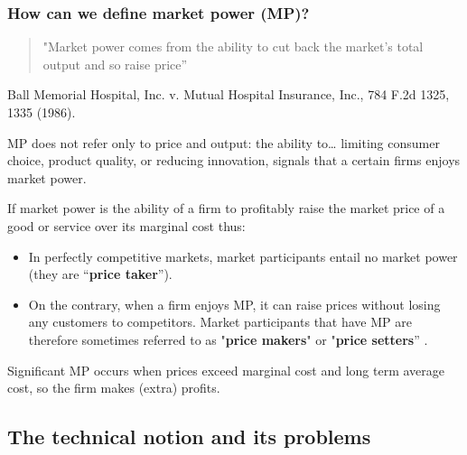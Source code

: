         \subsubsection{How can we define market power (MP)?}

            \begin{quote}
                 "Market power comes from the ability to cut back the market's total output and so raise price”
            \end{quote}
            Ball Memorial Hospital, Inc. v. Mutual Hospital Insurance, Inc., 784 F.2d 1325, 1335 (1986).


            MP does not refer only to price and output: the ability to… limiting consumer choice, product quality, or reducing innovation, signals that a certain firms enjoys market power.

            If market power is the ability of a firm to profitably raise the market price of a good or service over its marginal cost thus:
            \begin{itemize}
                \item In perfectly competitive markets, market participants entail no market power (they are “\textbf{price taker}”).
                \item On the contrary, when a firm enjoys MP, it can raise prices without losing any customers to competitors. Market participants that have MP are therefore sometimes referred to as "\textbf{price makers}" or "\textbf{price setters}” .
            \end{itemize}
            Significant MP occurs when prices exceed marginal cost and long term average cost, so the firm makes (extra) profits.

    \subsection{The technical notion and its problems}


